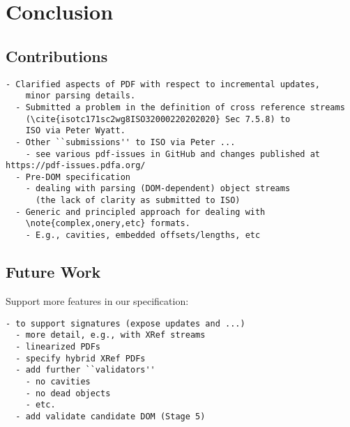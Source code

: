 \section{Conclusion }
\label{sec:conclusion}

\subsection{Contributions}

\begin{lstlisting}[style=meta]
  - Clarified aspects of PDF with respect to incremental updates,
    minor parsing details.
  - Submitted a problem in the definition of cross reference streams
    (\cite{isotc171sc2wg8ISO32000220202020} Sec 7.5.8) to
    ISO via Peter Wyatt.
  - Other ``submissions'' to ISO via Peter ...
    - see various pdf-issues in GitHub and changes published at https://pdf-issues.pdfa.org/
  - Pre-DOM specification
    - dealing with parsing (DOM-dependent) object streams
      (the lack of clarity as submitted to ISO)
  - Generic and principled approach for dealing with
    \note{complex,onery,etc} formats.
    - E.g., cavities, embedded offsets/lengths, etc
\end{lstlisting}

\subsection{Future Work}


Support more features in our specification:
\begin{lstlisting}[style=meta]
  - to support signatures (expose updates and ...)
  - more detail, e.g., with XRef streams
  - linearized PDFs
  - specify hybrid XRef PDFs
  - add further ``validators''
    - no cavities
    - no dead objects
    - etc.
  - add validate candidate DOM (Stage 5)
\end{lstlisting}

